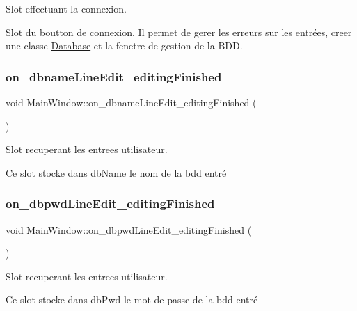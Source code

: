 Slot effectuant la connexion. 

Slot du boutton de connexion. Il permet de gerer les erreurs sur les entrées, creer une classe \mbox{\hyperlink{classDatabase}{Database}} et la fenetre de gestion de la B\+DD. \mbox{\label{classMainWindow_a4ad002ada4f696aed5badc4728590eea}} 
\subsubsection{\texorpdfstring{on\+\_\+dbname\+Line\+Edit\+\_\+editing\+Finished}{on\_dbnameLineEdit\_editingFinished}}
{\footnotesize\ttfamily void Main\+Window\+::on\+\_\+dbname\+Line\+Edit\+\_\+editing\+Finished (\begin{DoxyParamCaption}{ }\end{DoxyParamCaption})\hspace{0.3cm}{\ttfamily [slot]}}



Slot recuperant les entrees utilisateur. 

Ce slot stocke dans db\+Name le nom de la bdd entré \mbox{\label{classMainWindow_aefd7e7d3ddd36d873d0c972b9d89d0a3}} 
\subsubsection{\texorpdfstring{on\+\_\+dbpwd\+Line\+Edit\+\_\+editing\+Finished}{on\_dbpwdLineEdit\_editingFinished}}
{\footnotesize\ttfamily void Main\+Window\+::on\+\_\+dbpwd\+Line\+Edit\+\_\+editing\+Finished (\begin{DoxyParamCaption}{ }\end{DoxyParamCaption})\hspace{0.3cm}{\ttfamily [slot]}}



Slot recuperant les entrees utilisateur. 

Ce slot stocke dans db\+Pwd le mot de passe de la bdd entré \mbox{\label{classMainWindow_a33cdc4c422744bb769a725c28b7667d0}} 
